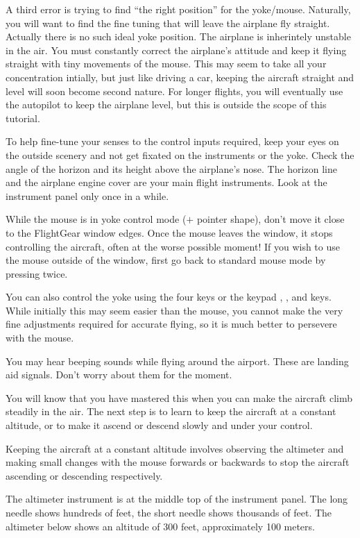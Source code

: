 A third error is trying to find ``the right position'' for the
yoke/mouse. Naturally, you will want to find the fine tuning that will leave
the airplane fly straight. Actually there is no such ideal yoke
position. The airplane is inherintely unstable in the air. You must constantly
correct the airplane's attitude and keep it flying straight with tiny movements
of the mouse. This may seem to take all your concentration intially,
but just like driving a car, keeping the aircraft straight and level will soon
become second nature. For longer flights, you will eventually use the autopilot
to keep the airplane level, but this is outside the scope of this tutorial.

To help fine-tune your senses to the control inputs required, keep your eyes on
the outside scenery and not get fixated on the instruments or the yoke. Check
the angle of the horizon and its height above the airplane's nose. The horizon
line and the airplane engine cover are your main flight instruments. Look at
the instrument panel only once in a while.

While the mouse is in yoke control mode
($+$ pointer shape), don't move it close to the FlightGear window
edges. Once the mouse leaves the window, it stops controlling the aircraft,
often at the worse possible moment!
If you wish to use the mouse outside of the window, first go back to standard
mouse mode by pressing  twice.

You can also control the yoke using the four  keys
or the keypad , ,  and  keys. While initially this
may seem easier than the mouse, you cannot make the very fine adjustments
required for accurate flying, so it is much better to persevere with the mouse.

You may hear beeping sounds while flying around the airport. These are
landing aid signals. Don't worry about them for the
moment.

You will know that you have mastered this when you can make the aircraft climb
steadily in the air. The next step is to learn to keep the aircraft at a
constant altitude, or to make it ascend or descend slowly and under your
control.

Keeping the aircraft at a constant altitude involves observing the altimeter
and making small changes with the mouse forwards or backwards to stop the
aircraft ascending or descending respectively.

 The altimeter instrument is at the middle top of the
instrument panel. The long needle shows hundreds of feet, the short needle
shows thousands of feet. The altimeter below shows an altitude of
300 feet, approximately 100 meters.


